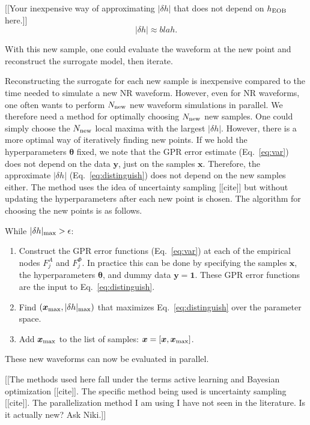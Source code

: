 \documentclass[prd,aps,letter,twocolumn,floatfix,notitlepage]{revtex4-1}
\begin{document}
[[Your inexpensive way of approximating $|\delta h |$ that does not depend on $h_{\rm EOB}$ here.]]
\begin{equation}
\label{eq:distinguish}
|\delta h | \approx blah.
\end{equation}


With this new sample, one could evaluate the waveform at the new point and reconstruct the surrogate model, then iterate.

Reconstructing the surrogate for each new sample is inexpensive compared to the time needed to simulate a new NR waveform. 
However, even for NR waveforms, one often wants to perform $N_{\rm new}$ new waveform simulations in parallel. 
We therefore need a method for optimally choosing $N_{\rm new}$ new samples. One could simply choose the 
$N_{\rm new}$ local maxima with the largest $|\delta h |$. However, there is a more optimal way of iteratively finding new points.
If we hold the hyperparameters ${\bm \theta}$ fixed, we note that the GPR error estimate (Eq.~\eqref{eq:var}) does not depend
on the data ${\bm y}$, just on the samples ${\bm x}$. Therefore, the approximate $|\delta h |$ (Eq.~\eqref{eq:distinguish}) does not depend
on the new samples either. The method uses the idea of uncertainty sampling [[cite]] but without updating the hyperparameters
after each new point is chosen. The algorithm for choosing the new points is as follows.

While $|\delta h |_{\rm max} > \epsilon$:
\begin{enumerate}
\item Construct the GPR error functions (Eq.~\eqref{eq:var}) at each of the empirical nodes $F^A_j$ and $F^\Phi_j$.
In practice this can be done by specifying the samples ${\bm x}$, the hyperparameters ${\bm \theta}$, and dummy 
data ${\bm y}={\bm 1}$. These GPR error functions are the input to Eq.~\eqref{eq:distinguish}.

\item Find $({\bm x}_{\rm max}, |\delta h |_{\rm max})$ that maximizes Eq.~\eqref{eq:distinguish} over the parameter space. 
\item Add ${\bm x}_{\rm max}$ to the list of samples: ${\bm x} = [{\bm x}, {\bm x}_{\rm max}]$.
\end{enumerate}
These new waveforms can now be evaluated in parallel.

[[The methods used here fall under the terms active learning and Bayesian optimization [[cite]]. The specific method being used is
uncertainty sampling [[cite]]. The parallelization method I am using I have not seen in the literature. Is it actually new? Ask Niki.]]
\end{document}
